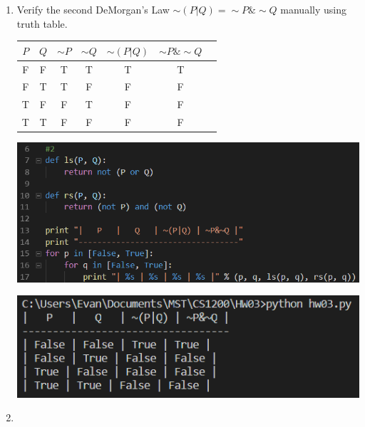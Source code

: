 \documentclass{article}
\begin{document}
\begin{enumerate}
    \newpage
    \item Verify the second DeMorgan's Law $\sim(P|Q) = \sim P\& \sim Q$ 
    manually using truth table.\\
    \vspace{1cm}
    \begin{tabular}{ |c|c|c|c|c|c|c| } 
        \hline
        $P$ & $Q$ & $\sim P$ & $\sim Q$ & $\sim(P|Q)$ & $\sim P\& \sim Q$\\ 
        \hline
        F & F & T & T & T & T\\ 
        \hline
        F & T & T & F & F & F\\ 
        \hline
        T & F & F & T & F & F\\ 
        \hline
        T & T & F & F & F & F\\ 
        \hline
    \end{tabular}

    \includegraphics[scale=.75]{2a}

    \includegraphics[scale=.75]{2b}

    \newpage
    \item 
    \begin{enumerate}
        

\end{enumerate}
\end{enumerate}
\end{document}

